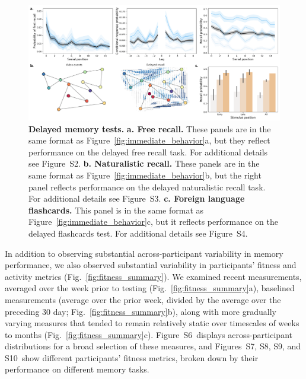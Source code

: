 \documentclass[10pt]{article}
\newcommand{\frDetail}{S2}
\newcommand{\natDetail}{S3}
\newcommand{\vocabDetail}{S4}
\newcommand{\fitDists}{S6}
\newcommand{\fitDistgridImmediate}{S7}
\newcommand{\fitScatterImmediate}{S8}
\newcommand{\fitDistgridDelayed}{S9}
\newcommand{\fitScatterDelayed}{S10}
\begin{document}
\begin{figure}[tp]
\centering
\includegraphics[width=1\textwidth]{figs/behavior_overview_delayed}
\caption{\textbf{Delayed memory tests.}  \textbf{a.  Free recall.}
  These panels are in the same format as
  Figure~\ref{fig:immediate_behavior}a, but they reflect performance
  on the delayed free recall task.  For additional details see
  Figure~\frDetail.  \textbf{b. Naturalistic recall.}  These panels
  are in the same format as Figure~\ref{fig:immediate_behavior}b, but
  the right panel reflects performance on the delayed naturalistic
  recall task.  For additional details see Figure~\natDetail.
  \textbf{c. Foreign language flashcards.} This panel is in the same
  format as Figure~\ref{fig:immediate_behavior}c, but it reflects
  performance on the delayed flashcards test.  For additional details
  see Figure~\vocabDetail.}
\label{fig:delayed_behavior}
\end{figure}

In addition to observing substantial across-participant variability in
memory performance, we also observed substantial variability in
participants' fitness and activity metrics
(Fig.~\ref{fig:fitness_summary}).  We examined recent measurements,
averaged over the week prior to testing
(Fig.~\ref{fig:fitness_summary}a), baselined measurements (average
over the prior week, divided by the average over the preceding 30 day;
Fig.~\ref{fig:fitness_summary}b), along with more gradually varying
measures that tended to remain relatively static over timescales of
weeks to months (Fig.~\ref{fig:fitness_summary}c).
Figure~\fitDists~displays across-participant
distributions for a broad selection of these measures, and Figures~\fitDistgridImmediate,
\fitScatterImmediate, \fitDistgridDelayed, and \fitScatterDelayed~show
different participants' fitness metrics, broken down by their
performance on different memory tasks.
\end{document}
